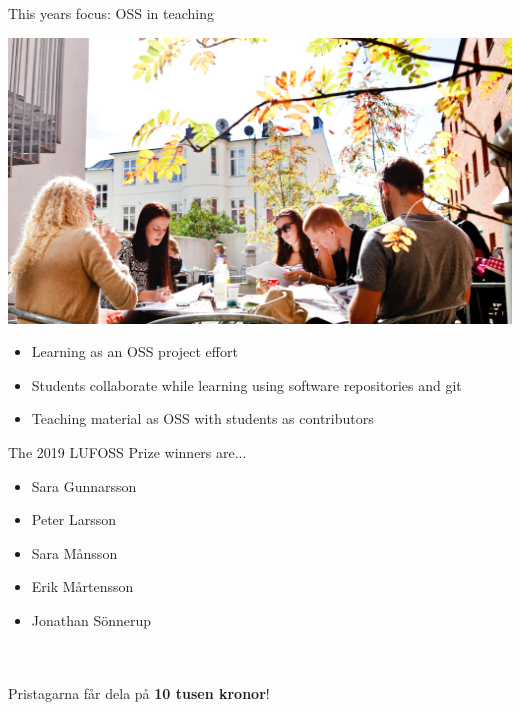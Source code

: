 \documentclass[aspectratio=169]{beamer}
\newenvironment{Slide}[1]%
  {\begin{frame}[environment=Slide]{#1}}
  {\end{frame}}%
\begin{document}
\begin{Slide}{This years focus: OSS in teaching}
\begin{minipage}{0.5\textwidth}
  \includegraphics[width=1.0\textwidth]{Pictures/titlepictureGroup}
\end{minipage}%
\begin{minipage}{0.5\textwidth}
  \begin{itemize}
    \item Learning as an OSS project effort
    \item Students collaborate while learning using software repositories and git
    \item Teaching material as OSS with students as contributors
  \end{itemize}
\end{minipage}

  \end{Slide}

\begin{Slide}{The 2019 LUFOSS Prize winners are...}
~\pause
\begin{itemize}
  \item Sara Gunnarsson
  \item Peter Larsson
  \item Sara Månsson
  \item Erik Mårtensson
  \item Jonathan Sönnerup
\end{itemize} 
~\\~\\Pristagarna får dela på \pause\textbf{10 tusen kronor}!
\end{Slide}
\end{document}
